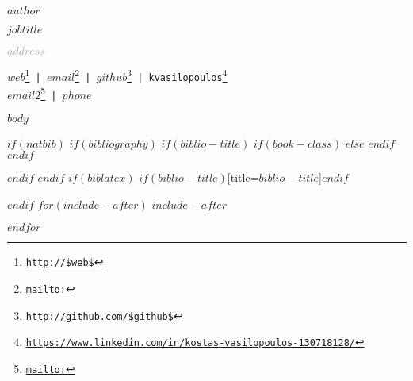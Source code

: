 \documentclass[$if(fontsize)$$fontsize$,$endif$$if(lang)$$babel-lang$,$endif$$if(papersize)$$papersize$paper,$endif$$for(classoption)$$classoption$$sep$,$endfor$]{$documentclass$}
\renewcommand{\href}[2]{#2\footnote{\url{#1}}}
\begin{document}
              
              
              \centerline{\huge \scshape $author$} %
              
              \vspace{2 mm}
              
              \centerline{\normalsize $jobtitle$}
              
              \vspace{2 mm}
              
              
              \centerline{\normalsize \textcolor{darkgray}{$address$}}
              
              \begin{center}
                \small
                \faGlobe \hspace{1mm} \href{http://$web$}{\tt $web$} \hspace{1mm} | 
                \hspace{1mm}  \faEnvelope \hspace{1mm} \href{mailto:}{\tt $email$} \hspace{1mm} | \hspace{1mm} \faGithub \hspace{1mm} \href{http://github.com/$github$}{\tt $github$} |
                \faLinkedin \hspace{1mm} \href{https://www.linkedin.com/in/kostas-vasilopoulos-130718128/}{\tt kvasilopoulos}
                \\ \vspace{2mm}
                \faEnvelopeO \hspace{1mm} \href{mailto:}{\tt $email2$} \hspace{1mm} | \hspace{1mm} \faPhone $phone$
              \end{center}
              
              \vspace{2 mm}
           
              
              $body$
              
                
                $if(natbib)$
                $if(bibliography)$
                $if(biblio-title)$
                $if(book-class)$
                \renewcommand\bibname{$biblio-title$}
              $else$
                \renewcommand\refname{$biblio-title$}
              $endif$
                $endif$
                
              
              $endif$
                $endif$
                $if(biblatex)$
                \printbibliography$if(biblio-title)$[title=$biblio-title$]$endif$
                
                $endif$
                $for(include-after)$
                $include-after$
                
                $endfor$
                
\end{document}
